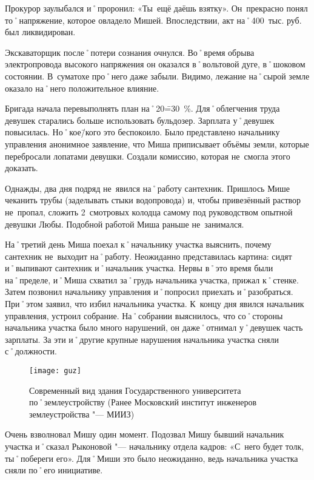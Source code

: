 Прокурор заулыбался и˚проронил: «Ты~ещё даёшь взятку». Он~прекрасно понял то˚напряжение, которое овладело Мишей. Впоследствии, акт на˚400~тыс. руб. был ликвидирован.

Экскаваторщик после˚потери сознания очнулся. Во˚время обрыва электропровода высокого напряжения он оказался в˚вольтовой дуге, в˚шоковом состоянии. В~суматохе про˚него даже забыли. Видимо, лежание на˚сырой земле оказало на˚него положительное влияние. 

Бригада начала перевыполнять план на˚20\==30~\%. Для˚облегчения труда девушек старались больше использовать бульдозер. Зарплата у˚девушек повысилась. Но˚кое\=/кого это беспокоило. Было представлено начальнику управления анонимное заявление, что Миша приписывает объёмы земли, которые перебросали лопатами девушки. Создали комиссию, которая не~смогла этого доказать.

Однажды, два дня подряд не~явился на˚работу сантехник. Пришлось Мише чеканить трубы (заделывать стыки водопровода) и, чтобы привезённый раствор не~пропал, сложить 2~смотровых колодца самому под руководством опытной девушки Любы. Подобной работой Миша раньше не~занимался.

На˚третий день Миша поехал к˚начальнику участка выяснить, почему сантехник не~выходит на˚работу. Неожиданно представилась картина: сидят и˚выпивают сантехник и˚начальник участка. Нервы в˚это время были на˚пределе, и˚Миша схватил за˚грудь начальника участка, прижал к˚стенке. Затем позвонил начальнику управления и˚попросил приехать и˚разобраться. При˚этом заявил, что избил начальника участка. К~концу дня явился начальник управления, устроил собрание. На˚собрании выяснилось, что со˚стороны начальника участка было много нарушений, он даже˚отнимал у˚девушек часть зарплаты. За эти и˚другие крупные нарушения начальника участка сняли с˚должности. 

\begin{wrapfigure}{O}{.4\textwidth}
\centering
\texttt{[image: guz]}
\caption[Современный вид здания Государственного университета по˚землеустройству (Ранее Московский институт инженеров землеустройства "--- МИИЗ)]{Современный вид здания Государственного университета по˚землеустройству (Ранее Московский институт инженеров землеустройства "--- МИИЗ)\footnotemark}
\label{fig:guz}
\end{wrapfigure}

Очень взволновал Мишу один момент. Подозвал Мишу бывший начальник участка и˚сказал Рыконовой "--- начальнику отдела кадров: «С~него будет толк, ты˚побереги его». Для˚Миши это было неожиданно, ведь начальника участка сняли по˚его инициативе. 

